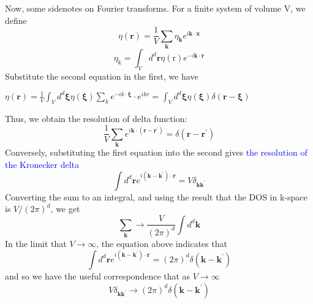 \documentclass[12pt,titlepage]{article}
\newcommand{\bluep}[1]{\textcolor{blue}{#1}}
\numberwithin{equation}{section}
\begin{document}
Now, some sidenotes on Fourier transforms. For a finite system of volume V, we define
\begin{equation}
\eta(\mathbf{r})=\frac{1}{V} \sum_{\mathbf{k}} \eta_{\mathbf{k}} e^{i \mathbf{k} \cdot \mathbf{x}}
\end{equation}
\begin{equation}
\eta_{\mathrm{k}}=\int_{V} d^{d} \mathbf{r} \eta(\mathrm{r}) e^{-i \mathbf{k} \cdot \mathbf{r}}
\end{equation}
Substitute the second equation in the first, we have

$\displaystyle \eta (\boldsymbol{r}) =\frac{1}{V}\int _{V} d^{d}\boldsymbol{\xi } \eta (\boldsymbol{\xi })\sum _{k} e^{-ik\cdot \boldsymbol{\xi }} \cdot e^{ikr} =\int _{V} d^{d}\boldsymbol{\xi } \eta (\boldsymbol{\xi }) \delta (\boldsymbol{r} -\boldsymbol{\xi })$

Thus, we obtain the resolution of delta function:
\begin{equation}
\frac{1}{V} \sum_{\mathbf{k}} e^{i \mathbf{k} \cdot\left(\mathbf{r}-\mathbf{r}^{\prime}\right)}=\delta\left(\mathbf{r}-\mathbf{r}^{\prime}\right)
\end{equation}
Conversely, substituting the first equation into the second gives \bluep{the resolution of the Kronecker delta}
\begin{equation}
\int d^{d} \mathbf{r} e^{i\left(\mathbf{k}-\mathbf{k}^{\prime}\right) \cdot \mathbf{r}}=V \delta_{\mathbf{k} \mathbf{k}^{\prime}}
\end{equation}
Converting the sum to an integral, and using the result that the DOS in k-space is $V /(2 \pi)^{d}$, we get
\begin{equation}
\sum_{\mathbf{k}} \rightarrow \frac{V}{(2 \pi)^{d}} \int d^{d} \mathbf{k}
\end{equation}
In the limit that $V \rightarrow \infty$, the equation above indicates that
\begin{equation}
\int d^{d} \mathbf{r} e^{i\left(\mathbf{k}-\mathbf{k}^{\prime}\right) \cdot \mathbf{r}}=(2 \pi)^{d} \delta\left(\mathbf{k}-\mathbf{k}^{\prime}\right)
\end{equation}
and so we have the useful correspondence that as $V \rightarrow \infty$
\begin{equation}
V \delta_{\mathbf{k} \mathbf{k}^{\prime}} \longrightarrow(2 \pi)^{d} \delta\left(\mathbf{k}-\mathbf{k}^{\prime}\right)
\end{equation}
\end{document}
